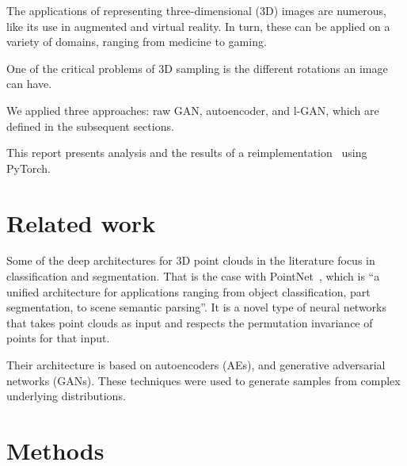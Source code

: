 \documentclass[12pt]{article}
\newcommand{\contentdescription}[1]{}
\begin{document}
    The applications of representing three-dimensional (3D) images are numerous, like its use in augmented and virtual reality.
    In turn, these can be applied on a variety of domains, ranging from medicine to gaming.

    One of the critical problems of 3D sampling is the different rotations an image can have.

    We applied three approaches: raw GAN, autoencoder, and l-GAN, which are defined in the subsequent sections.

    This report presents analysis and the results of a reimplementation~\cite{pmlr-v80-achlioptas18a} using PyTorch.


    \section{Related work}
    \contentdescription{
        Related Work (5-15\%):
        Discuss the published work related to your project paper, the types of experiments you do and the additional method that you have added to this work or you have compared this paper with (if any).
    }


    Some of the deep architectures for 3D point clouds in the literature focus in classification and segmentation.
    That is the case with PointNet~\cite{arxiv:1612.00593},
    which is ``a unified architecture for applications ranging from object classification, part segmentation, to scene semantic parsing''.
    It is a novel type of neural networks that takes point clouds as input and respects the permutation invariance of points for that input.

    Their architecture is based on autoencoders (AEs)\cite{doi:10.5555/65669.104451}\cite{arxiv:1312.6114},
    and generative adversarial networks (GANs)\cite{NIPS2014_5ca3e9b1}\cite{arxiv:1511.06434}\cite{arxiv:1612.02136}.
    These techniques were used to generate samples from complex underlying distributions.


    \section{Methods}
    \contentdescription{
        Methods (15-25\%):
        Describe the original paper's method to the extent that you would need to make your report and findings understandable.
        Otherwise, here you can describe other methods that you compare with or other methods that you apply on top of what you reimplemented.
        Here, you also try to justify any methodical modification or incremental changes that you have added to the original paper.
        It may be helpful to include figures, diagrams, or tables to describe your method or compare it with other methods.
    }
\end{document}
